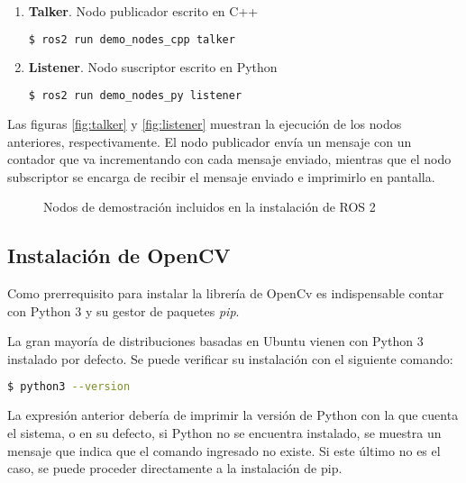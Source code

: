 \begin{enumerate}
    \item \textbf{Talker}. Nodo publicador escrito en C++
    \begin{lstlisting}[language = bash]
        $ ros2 run demo_nodes_cpp talker
    \end{lstlisting}
    
    \item \textbf{Listener}. Nodo suscriptor escrito en Python
    \begin{lstlisting}[language = bash]
        $ ros2 run demo_nodes_py listener
    \end{lstlisting}
\end{enumerate}

Las figuras \ref{fig:talker} y \ref{fig:listener} muestran la ejecución de los nodos anteriores, respectivamente. El nodo publicador envía un mensaje con un contador que va incrementando con cada mensaje enviado, mientras que el nodo subscriptor se encarga de recibir el mensaje enviado e imprimirlo en pantalla.

\begin{figure}[ht]
    \centering
    \hfill
    \caption{Nodos de demostración incluidos en la instalación de ROS 2}
    \label{fig:rosdemo}
\end{figure}

\subsection{Instalación de OpenCV}

Como prerrequisito para instalar la librería de OpenCv es indispensable contar con Python 3 y su gestor de paquetes \textit{pip}. 

La gran mayoría de distribuciones basadas en Ubuntu vienen con Python 3 instalado por defecto. Se puede verificar su instalación con el siguiente comando:

\begin{lstlisting}[language = bash]
    $ python3 --version 
\end{lstlisting}

La expresión anterior debería de imprimir la versión de Python con la que cuenta el sistema, o en su defecto, si Python no se encuentra instalado, se muestra un mensaje que indica que el comando ingresado no existe. Si este último no es el caso, se puede proceder directamente a la instalación de pip.

